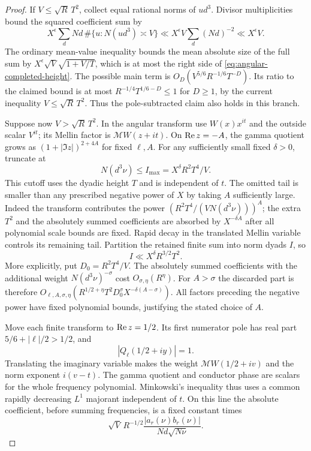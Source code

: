 \begin{proof}
If $V\le\sqrt R\,T^2$, collect equal rational norms of $ud^3$.
Divisor multiplicities bound the squared coefficient sum by
\[
 X^\epsilon\sum_d Nd\,
       \#\{u:N(ud^3)\asymp V\}
       \ll X^\epsilon V\sum_d(Nd)^{-2}
       \ll X^\epsilon V.
\]
The ordinary mean-value inequality bounds the mean absolute size
of the full sum by $X^\epsilon\sqrt V\sqrt{1+V/T}$, which is at
most the right side of \eqref{eq:angular-completed-height}.
The possible main term is
$O_D(V^{5/6}R^{-1/6}T^{-D})$. Its ratio to the claimed bound is
at most $R^{-1/4}T^{1/6-D}\le1$ for $D\ge1$, by the current
inequality $V\le\sqrt R\,T^2$. Thus the pole-subtracted claim
also holds in this branch.

Suppose now $V>\sqrt R\,T^2$. In the angular transform use
$W(x)x^{it}$ and the outside scalar $V^{it}$; its Mellin factor is
$\mathcal MW(z+it)$. On $\operatorname{Re} z=-A$, the gamma quotient grows
as $(1+|\Im z|)^{2+4A}$ for fixed $\ell,A$.
For any sufficiently small fixed $\delta>0$, truncate at
\[
N(d^3\nu)\le I_{\max}=X^\delta R^2T^4/V.
\]
This cutoff uses the dyadic height $T$ and is independent of $t$.
The omitted tail is smaller than any prescribed negative power
of $X$ by taking $A$ sufficiently large. Indeed the transform
contributes the power $(R^2T^4/(VN(d^3\nu)))^A$; the extra
$T^2$ and the absolutely summed coefficients are absorbed by
$X^{-\delta A}$ after all polynomial scale bounds are fixed.
Rapid decay in the translated Mellin variable controls its remaining
tail. Partition the retained finite sum into norm dyads $I$, so
\[
 I\ll X^\delta R^{3/2}T^2.
\]
More explicitly, put $D_0=R^2T^4/V$. The absolutely summed
coefficients with the additional weight $N(d^3\nu)^{-\sigma}$
cost $O_{\sigma,\eta}(R^\eta)$. For $A>\sigma$ the discarded
part is therefore
$O_{\ell,A,\sigma,\eta}(R^{1/2+\eta}T^2D_0^\sigma
X^{-\delta(A-\sigma)})$.
All factors preceding the negative power have fixed polynomial
bounds, justifying the stated choice of $A$.

Move each finite transform to $\operatorname{Re} z=1/2$. Its first numerator
pole has real part $5/6+|\ell|/2>1/2$, and
\[
 |Q_\ell(1/2+iy)|=1.
\]
Translating the imaginary variable makes the weight
$\mathcal MW(1/2+iv)$ and the norm exponent $i(v-t)$.
The gamma quotient and conductor phase are scalars for the whole
frequency polynomial. Minkowski's inequality thus uses a common
rapidly decreasing $L^1$ majorant independent of $t$.
On this line the absolute coefficient, before summing frequencies,
is a fixed constant times
\[
 \sqrt V\,R^{-1/2}
       \frac{|a_r(\nu)b_r(\nu)|}{Nd\sqrt{N\nu}}.
\]


\end{proof}
